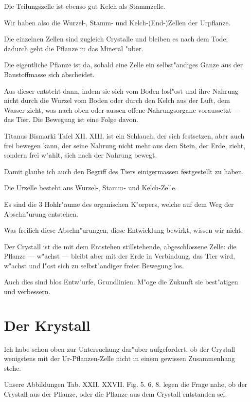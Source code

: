 \documentclass[a4paper, 11pt, oneside, german]{article}
\begin{document}
Die Teilungszelle ist ebenso gut Kelch als Stammzelle.

Wir haben also die Wurzel-, Stamm- und Kelch-(End-)Zellen der Urpflanze.

Die einzelnen Zellen sind zugleich Crystalle und bleiben es nach dem Tode; dadurch geht die Pflanze in das Mineral "uber.

Die eigentliche Pflanze ist da, sobald eine Zelle ein selbst"andiges Ganze aus der Baustoffmasse sich abscheidet.

Aus dieser entsteht dann, indem sie sich vom Boden losl"ost und ihre Nahrung nicht durch die Wurzel vom Boden oder durch den Kelch aus der Luft, dem Wasser zieht, was nach oben oder aussen offene Nahrungsorgane voraussetzt --- das Tier. Die Bewegung ist eine Folge davon.

Titanus Bismarki Tafel XII. XIII. ist ein Schlauch, der sich festsetzen, aber auch frei bewegen kann, der seine Nahrung nicht mehr aus dem Stein, der Erde, zieht, sondern frei w"ahlt, sich nach der Nahrung bewegt.

Damit glaube ich auch den Begriff des Tiers einigermassen festgestellt zu haben.

Die Urzelle besteht aus Wurzel-, Stamm- und Kelch-Zelle.

Es sind die 3 Hohlr"aume des organischen K"orpers, welche auf dem Weg der Abschn"urung entstehen.

Was freilich diese Abschn"urungen, diese Entwicklung bewirkt, wissen wir nicht.

Der Crystall ist die mit dem Entstehen stillstehende, abgeschlossene Zelle: die Pflanze --- w"achst --- bleibt aber mit der Erde in Verbindung, das Tier wird, w"achst und l"ost sich zu selbst"andiger freier Bewegung los.

Auch dies sind blos Entw"urfe, Grundlinien. M"oge die Zukunft sie best"atigen und verbessern.
\clearpage
\section{Der Krystall}
\paragraph{}
Ich habe schon oben zur Untersuchung dar"uber aufgefordert, ob der Crystall wenigstens mit der Ur-Pflanzen-Zelle nicht in einem gewissen Zusammenhang stehe.

Unsere Abbildungen Tab. XXII. XXVII. Fig. 5. 6. 8. legen die Frage nahe, ob der Crystall aus der Pflanze, oder die Pflanze aus dem Crystall entstanden sei.
\end{document}
